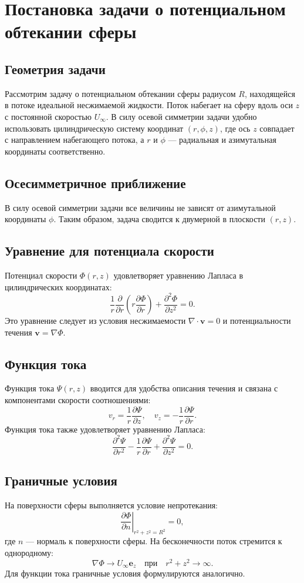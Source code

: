 \section{Постановка задачи о потенциальном обтекании сферы}

\subsection{Геометрия задачи}
Рассмотрим задачу о потенциальном обтекании сферы радиусом \( R \), находящейся в потоке идеальной несжимаемой жидкости. Поток набегает на сферу вдоль оси \( z \) с постоянной скоростью \( U_\infty \). В силу осевой симметрии задачи удобно использовать цилиндрическую систему координат \( (r, \phi, z) \), где ось \( z \) совпадает с направлением набегающего потока, а \( r \) и \( \phi \) — радиальная и азимутальная координаты соответственно.

\subsection{Осесимметричное приближение}
В силу осевой симметрии задачи все величины не зависят от азимутальной координаты \( \phi \). Таким образом, задача сводится к двумерной в плоскости \( (r, z) \).

\subsection{Уравнение для потенциала скорости}
Потенциал скорости \( \Phi(r, z) \) удовлетворяет уравнению Лапласа в цилиндрических координатах:
\[
\frac{1}{r} \frac{\partial}{\partial r} \left( r \frac{\partial \Phi}{\partial r} \right) + \frac{\partial^2 \Phi}{\partial z^2} = 0.
\]
Это уравнение следует из условия несжимаемости \( \nabla \cdot \mathbf{v} = 0 \) и потенциальности течения \( \mathbf{v} = \nabla \Phi \).

\subsection{Функция тока}
Функция тока \( \Psi(r, z) \) вводится для удобства описания течения и связана с компонентами скорости соотношениями:
\[
v_r = \frac{1}{r} \frac{\partial \Psi}{\partial z}, \quad v_z = -\frac{1}{r} \frac{\partial \Psi}{\partial r}.
\]
Функция тока также удовлетворяет уравнению Лапласа:
\[
\frac{\partial^2 \Psi}{\partial r^2} - \frac{1}{r} \frac{\partial \Psi}{\partial r} + \frac{\partial^2 \Psi}{\partial z^2} = 0.
\]

\subsection{Граничные условия}
На поверхности сферы выполняется условие непротекания:
\[
\left. \frac{\partial \Phi}{\partial n} \right|_{r^2 + z^2 = R^2} = 0,
\]
где \( n \) — нормаль к поверхности сферы. На бесконечности поток стремится к однородному:
\[
\nabla \Phi \to U_\infty \mathbf{e}_z \quad \text{при} \quad r^2 + z^2 \to \infty.
\]
Для функции тока граничные условия формулируются аналогично.